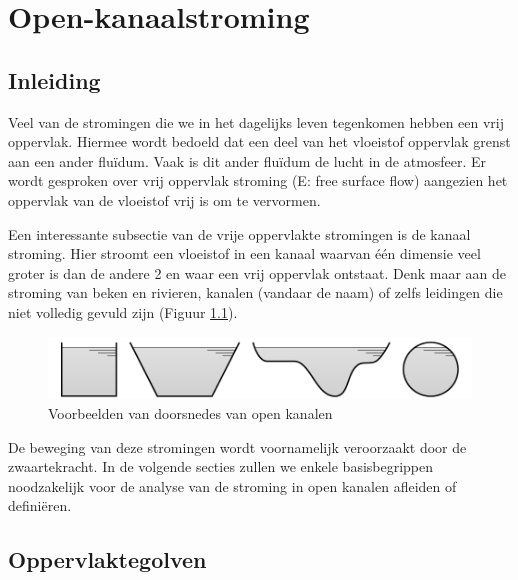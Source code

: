 \chapter{Open-kanaalstroming}
\label{sec:Kanaalstroming}

	\section{Inleiding}
	\label{sec:Kanaalstroming Inleiding}
Veel van de stromingen die we in het dagelijks leven tegenkomen hebben een vrij oppervlak. Hiermee wordt bedoeld dat een deel van het vloeistof oppervlak grenst aan een ander fluïdum. Vaak is dit ander fluïdum de lucht in de atmosfeer. Er wordt gesproken over vrij oppervlak stroming (E: free surface flow) aangezien het oppervlak van de vloeistof vrij is om te vervormen.

Een interessante subsectie van de vrije oppervlakte stromingen is de kanaal stroming. Hier stroomt een vloeistof in een kanaal waarvan één dimensie veel groter is dan de andere 2 en waar een vrij oppervlak ontstaat. Denk maar aan de stroming van beken en rivieren, kanalen (vandaar de naam) of zelfs leidingen die niet volledig gevuld zijn (Figuur \ref{fig:Open_kanaal_doorsnedes}). 
\begin{figure}[htb]
	\centering
	\includegraphics{fig/kanaalstroming/Open_kanaal_doorsnedes}
	\caption{Voorbeelden van doorsnedes van open kanalen}
	\label{fig:Open_kanaal_doorsnedes}
\end{figure}

De beweging van deze stromingen wordt voornamelijk veroorzaakt door de zwaartekracht. In de volgende secties zullen we enkele basisbegrippen noodzakelijk voor de analyse van de stroming in open kanalen afleiden of definiëren.

	\section{Oppervlaktegolven}
	\label{sec:Oppervlaktegolven}
	
